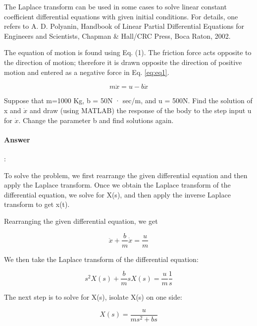\documentclass{article}
\begin{document}
\begin{tcolorbox}
  The Laplace transform can be used in some cases to solve linear constant coeﬀicient differential equations with given initial conditions. For details, one refers to A. D. Polyanin, Handbook of Linear Partial Differential Equations for Engineers and Scientists, Chapman \& Hall/CRC Press, Boca Raton, 2002.
\end{tcolorbox}

The equation of motion is found using Eq. (1). The friction force acts opposite to the direction of motion; therefore it is drawn opposite the direction of positive motion and entered as a negative force in Eq. \eqref{eq:eq1}.

\begin{equation}
  m\ddot{x} = u - b\dot{x}
  \label{eq:eq1}
\end{equation}

Suppose that m=1000 Kg, b = 50N · sec/m, and u = 500N. Find the solution of x and $\dot{x}$ and draw (using MATLAB) the response of the body to the step input u for $\dot{x}$. Change the parameter b and find solutions again.

\paragraph{Answer}:

To solve the problem, we first rearrange the given differential equation and then apply the Laplace transform. Once we obtain the Laplace transform of the differential equation, we solve for X(s), and then apply the inverse Laplace transform to get x(t).

Rearranging the given differential equation, we get

\begin{equation*}
  \ddot{x} + \frac{b}{m}\dot{x} = \frac{u}{m}
\end{equation*}

We then take the Laplace transform of the differential equation:

\begin{equation*}
  s^2X(s) + \frac{b}{m}sX(s) = \frac{u}{m}\frac{1}{s}
\end{equation*}


The next step is to solve for X(s), isolate X(s) on one side:

\begin{equation*}
  X(s) = \frac{u}{ms^2 + bs}
\end{equation*}
\end{document}
